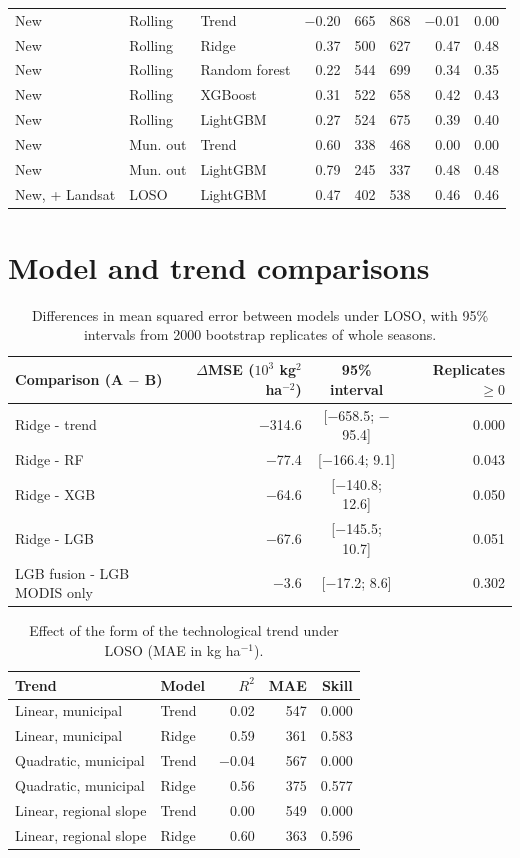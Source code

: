 \begin{longtable}{@{}lllrrrrr@{}}
New & Rolling & Trend & $-$0.20 & 665 & 868 & $-$0.01 & 0.00 \\
New & Rolling & Ridge & 0.37 & 500 & 627 & 0.47 & 0.48 \\
New & Rolling & Random forest & 0.22 & 544 & 699 & 0.34 & 0.35 \\
New & Rolling & XGBoost & 0.31 & 522 & 658 & 0.42 & 0.43 \\
New & Rolling & LightGBM & 0.27 & 524 & 675 & 0.39 & 0.40 \\
New & Mun. out & Trend & 0.60 & 338 & 468 & 0.00 & 0.00 \\
New & Mun. out & LightGBM & 0.79 & 245 & 337 & 0.48 & 0.48 \\
New, + Landsat & LOSO & LightGBM & 0.47 & 402 & 538 & 0.46 & 0.46 \\
\bottomrule
\end{longtable}
\endgroup


\section{Model and trend comparisons}

\begin{table}[H]
\centering
\caption{Differences in mean squared error between models under LOSO, with 95\% intervals from 2000 bootstrap replicates of whole seasons.}\label{tab:S_boot}
\small
\begin{tabular}{@{}lrcr@{}}
\toprule
Comparison (A $-$ B) & $\Delta$MSE ($10^3$ kg$^2$ ha$^{-2}$) & 95\% interval & Replicates $\ge 0$ \\
\midrule
Ridge - trend & $-$314.6 & [$-$658.5; $-$95.4] & 0.000 \\
Ridge - RF & $-$77.4 & [$-$166.4; 9.1] & 0.043 \\
Ridge - XGB & $-$64.6 & [$-$140.8; 12.6] & 0.050 \\
Ridge - LGB & $-$67.6 & [$-$145.5; 10.7] & 0.051 \\
LGB fusion - LGB MODIS only & $-$3.6 & [$-$17.2; 8.6] & 0.302 \\
\bottomrule
\end{tabular}
\end{table}
\begin{table}[H]
\centering
\caption{Effect of the form of the technological trend under LOSO (MAE in kg ha$^{-1}$).}\label{tab:S_trend}
\small
\begin{tabular}{@{}llrrr@{}}
\toprule
Trend & Model & $R^2$ & MAE & Skill \\
\midrule
Linear, municipal & Trend & 0.02 & 547 & 0.000 \\
Linear, municipal & Ridge & 0.59 & 361 & 0.583 \\
Quadratic, municipal & Trend & $-$0.04 & 567 & 0.000 \\
Quadratic, municipal & Ridge & 0.56 & 375 & 0.577 \\
Linear, regional slope & Trend & 0.00 & 549 & 0.000 \\
Linear, regional slope & Ridge & 0.60 & 363 & 0.596 \\
\bottomrule
\end{tabular}
\end{table}


